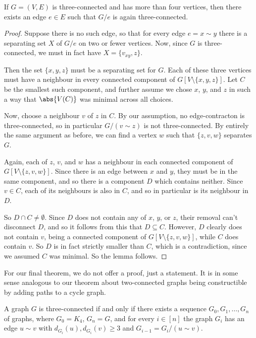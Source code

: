 \documentclass[nobib]{tufte-handout}
\begin{document}
\begin{lemma}
  If $G = (V,E)$ is three-connected and has more than four vertices, then there exists an edge $e \in E$ such that $G/e$ is again three-connected.

  \begin{proof}
    Suppose there is no such edge, so that for every edge $e = x \sim y$ there is a separating set $X$ of $G/e$ on two or fewer vertices. Now, since $G$ is three-connected, we must in fact have $X = \{v_{xy}, z\}$.

    Then the set $\{x, y, z\}$ must be a separating set for $G$. Each of these three vertices must have a neighbour in every connected component of $G[V \setminus \{x,y,z\}]$. Let $C$ be the smallest such component, and further assume we chose $x$, $y$, and $z$ in such a way that $\abs{V(C)}$ was minimal across all choices.

    Now, choose a neighbour $v$ of $z$ in $C$. By our assumption, no edge-contracton is three-connected, so in particular $G/(v \sim z)$ is not three-connected. By entirely the same argument as before, we can find a vertex $w$ such that $\{z,v,w\}$ separates $G$.

    Again, each of $z$, $v$, and $w$ has a neighbour in each connected component of $G[V \setminus \{z, v, w\}]$. Since there is an edge between $x$ and $y$, they must be in the same component, and so there is a component $D$ which contains neither. Since $v \in C$, each of its neighbours is also in $C$, and so in particular is its neighbour in $D$.

    So $D \cap C \neq \emptyset$. Since $D$ does not contain any of $x$, $y$, or $z$, their removal can't disconnect $D$, and so it follows from this that $D \subseteq C$. However, $D$ clearly does not contain $v$, being a connected component of $G[V \setminus \{z, v, w\}]$, while $C$ does contain $v$. So $D$ is in fact strictly smaller than $C$, which is a contradiction, since we assumed $C$ was minimal. So the lemma follows.
  \end{proof}
\end{lemma}

For our final theorem, we do not offer a proof, just a statement. It is in some sense analogous to our theorem about two-connected graphs being constructible by adding paths to a cycle graph.

\begin{theorem}[Tutte, 1961]
  A graph $G$ is three-connected if and only if there exists a sequence $G_0, G_1,\ldots, G_n$ of graphs, where $G_0 = K_4$, $G_n = G$, and for every $i \in [n]$ the graph $G_i$ has an edge $u \sim v$ with $d_{G_i}(u), d_{G_i}(v) \geq 3$ and $G_{i-1} = G_i/(u\sim v)$.
\end{theorem}
\end{document}
